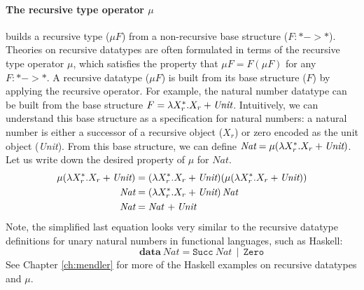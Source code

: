 \paragraph{The recursive type operator $\mu$} builds a recursive type
($\mu F$) from a non-recursive base structure ($F:* -> *$).
Theories on recursive datatypes are often formulated in terms of
the recursive type operator $\mu$, which satisfies the property
that $\mu F = F (\mu F)$ for any $F: * -> *$. A recursive datatype ($\mu F$)
is built from its base structure ($F$) by applying the recursive operator.
For example, the natural number datatype can be built from the base structure
$F = \lambda X_r^{*}.X_r + \textit{Unit}$. Intuitively, we can understand this
base structure as a specification for natural numbers: a natural number is
either a successor of a recursive object ($X_r$)
or zero encoded as the unit object (\textit{Unit}).
From this base structure, we can define
$\textit{Nat} = \mu(\lambda X_r^{*}.X_r + \textit{Unit})$.
Let us write down the desired property of $\mu$ for $\textit{Nat}$.
\begin{align*}
\mu(\lambda X_r^{*}.X_r + \textit{Unit}) &=
(\lambda X_r^{*}.X_r + \textit{Unit})(\mu(\lambda X_r^{*}.X_r + \textit{Unit})) \\
\textit{Nat} &= (\lambda X_r^{*}.X_r + \textit{Unit})\,\textit{Nat} \\
\textit{Nat} &= \textit{Nat}\, + \textit{Unit}
\end{align*}
Note, the simplified last equation looks very similar to
the recursive datatype definitions for unary natural numbers
in functional languages, such as Haskell: \[ \qquad\qquad
\textbf{data}~\textit{Nat} = \texttt{Succ}~\textit{Nat}\,\mid\,\texttt{Zero} \]
See Chapter \ref{ch:mendler} %
for more of the Haskell examples on recursive datatypes and $\mu$.

